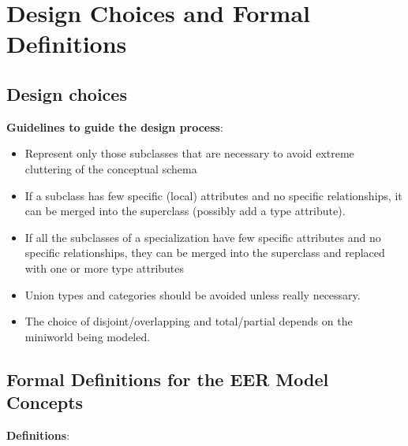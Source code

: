 \section{Design Choices and Formal Definitions}

\subsection{Design choices}

\textbf{Guidelines to guide the design process}:\\

\begin{itemize}
    \item Represent only those subclasses that are necessary to avoid extreme cluttering of the conceptual schema
    \item If a subclass has few specific (local) attributes and no specific relationships, it can be merged into the superclass (possibly add a type attribute).
    \item If all the subclasses of a specialization have few specific attributes and no specific relationships, they can be merged into the superclass and replaced with one or more type attributes
    \item Union types and categories should be avoided unless really necessary.
    \item The choice of disjoint/overlapping and total/partial depends on the miniworld being modeled.
\end{itemize}

\subsection{Formal Definitions for the EER Model Concepts}

\textbf{Definitions}:\\

